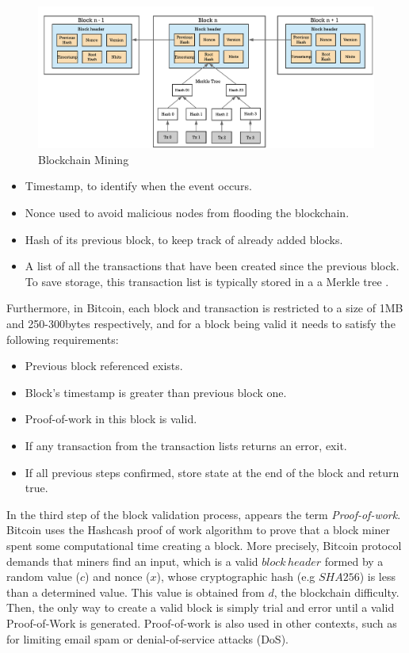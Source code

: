 \begin{figure}[t]
  	\includegraphics[width=1\linewidth]{gfx/mining}    
  	\caption{Blockchain Mining}
  	\label{fig:Blockchain mining}
\end{figure}

\begin{itemize}
	
	\item Timestamp, to identify when the event occurs.
	\item Nonce used to avoid malicious nodes from flooding the blockchain.
	\item Hash of its previous block, to keep track of already added blocks. 
	\item A list of all the transactions that have been created since the previous block. To save storage, this transaction list is typically stored in a a Merkle tree \citep{merkle1987digital}.
\end{itemize}

Furthermore, in Bitcoin, each block and transaction is restricted to a size of 1MB and 250-300bytes respectively, and for a block being valid it needs to satisfy the following requirements:

\begin{itemize}
	
	\item Previous block referenced exists.
	\item Block's timestamp is greater than previous block one.
	\item Proof-of-work in this block is valid.
	\item If any transaction from the transaction lists returns an error, exit.
	\item If all previous steps confirmed, store state at the end of the block and return true.
\end{itemize}  

In the third step of the block validation process, appears the term \textit{Proof-of-work}. Bitcoin uses the Hashcash proof of work algorithm to prove that a block miner spent some computational time creating a block. More precisely, Bitcoin protocol demands that miners find an input, which is a valid $block \, header$ formed by a random value ($c$) and nonce ($x$), whose cryptographic hash (e.g $SHA256$) is less than a determined value. This value is obtained from $d$, the blockchain difficulty. Then, the only way to create a valid block is simply trial and error until a valid Proof-of-Work is generated. Proof-of-work is also used in other contexts, such as for limiting email spam or denial-of-service attacks (DoS).

